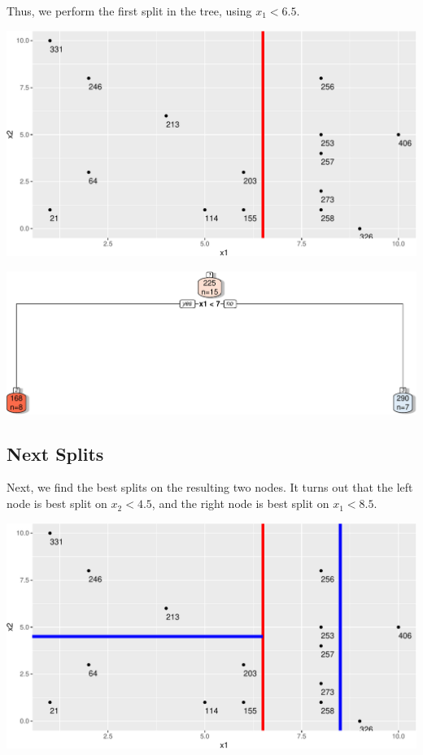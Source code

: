 \documentclass[
  letterpaper,
  DIV=11,
  numbers=noendperiod]{scrreprt}
\begin{document}
Thus, we perform the first split in the tree, using \(x_1 < 6.5\).

\includegraphics{Ch7_files/figure-pdf/unnamed-chunk-55-1.pdf}

\includegraphics{Ch7_files/figure-pdf/unnamed-chunk-56-1.pdf}

\subsection{Next Splits}\label{next-splits}

Next, we find the best splits on the resulting two nodes. It turns out
that the left node is best split on \(x_2 < 4.5\), and the right node is
best split on \(x_1 < 8.5\).

\includegraphics{Ch7_files/figure-pdf/unnamed-chunk-57-1.pdf}
\end{document}
